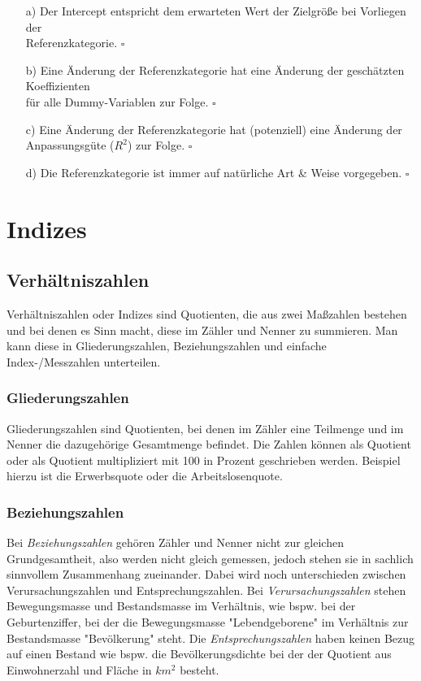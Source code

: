 \documentclass[a4paper]{article}
\begin{document}
\begin{itemize}
    \item[a)] Der Intercept entspricht dem erwarteten Wert der Zielgröße bei Vorliegen der\\Referenzkategorie. \hfill $\square$
    \item[b)] Eine Änderung der Referenzkategorie hat eine Änderung der geschätzten Koeffizienten\\für alle Dummy-Variablen zur Folge. \hfill $\square$
    \item[c)] Eine Änderung der Referenzkategorie hat (potenziell) eine Änderung der\\Anpassungsgüte ($R^2$) zur Folge. \hfill $\square$
    \item[d)] Die Referenzkategorie ist immer auf natürliche Art \& Weise vorgegeben. \hfill $\square$
\end{itemize}

\newpage

\section{Indizes}
\subsection{Verhältniszahlen}
Verhältniszahlen oder Indizes sind Quotienten, die aus zwei Maßzahlen bestehen und bei denen es Sinn macht, diese im Zähler und Nenner zu summieren. Man kann diese in Gliederungszahlen, Beziehungszahlen und einfache Index-/Messzahlen unterteilen.
\subsubsection{Gliederungszahlen}
Gliederungszahlen sind Quotienten, bei denen im Zähler eine Teilmenge und im Nenner die dazugehörige Gesamtmenge befindet. Die Zahlen können als Quotient oder als Quotient multipliziert mit 100 in Prozent geschrieben werden. Beispiel hierzu ist die Erwerbsquote oder die Arbeitslosenquote.
\subsubsection{Beziehungszahlen}
Bei \textit{Beziehungszahlen} gehören Zähler und Nenner nicht zur gleichen Grundgesamtheit, also werden nicht gleich gemessen, jedoch stehen sie in sachlich sinnvollem Zusammenhang zueinander. Dabei wird noch unterschieden zwischen Verursachungszahlen und Entsprechungszahlen. Bei \textit{Verursachungszahlen} stehen Bewegungsmasse und Bestandsmasse im Verhältnis, wie bspw. bei der Geburtenziffer, bei der die Bewegungsmasse "Lebendgeborene" im Verhältnis zur Bestandsmasse "Bevölkerung" steht.
Die \textit{Entsprechungszahlen} haben keinen Bezug auf einen Bestand wie bspw. die Bevölkerungsdichte bei der der Quotient aus Einwohnerzahl und Fläche in $km^2$ besteht.
\end{document}
